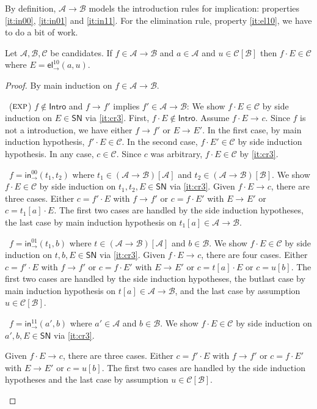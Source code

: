 \documentclass[a4paper,USenglish,cleveref, autoref, thm-restate]{lipics-v2019}
\newenvironment{caselist}{%
  \begin{list}{{\it Case}}{%
  }%
}{\end{list}%
}
\newcommand{\nextcase}{\item~}
\newcommand{\rulename}[1]{\ensuremath{\mbox{\textsc{#1}}}\xspace}
\newcommand{\rexp}{\rulename{exp}}
\newcommand{\tin}{\ensuremath{\mathsf{in}}}
\newcommand{\inn}[2]{\ensuremath{\tin_{#1}^{#2}}}
\newcommand{\tel}{\mathsf{el}}
\newcommand{\el}[2]{\ensuremath{\tel_{#1}^{#2}}}
\newcommand{\red}[1][]{\longrightarrow_{#1}}
\newcommand{\A}{\mathcal{A}}
\newcommand{\B}{\mathcal{B}}
\newcommand{\C}{\mathcal{C}}
\newcommand{\SN}{\mathsf{SN}}
\newcommand{\Intro}{\mathsf{Intro}}
\newcommand{\ind}[1]{}    %
\newcommand{\indp}[2]{#1} %
\begin{document}
By definition, $\A \to \B$ models the introduction rules for
implication:
properties \ref{it:in00}, \ref{it:in01} and \ref{it:in11}.
For the elimination rule, property \ref{it:el10}, we have to do a bit of work.
\begin{lemma}
  \label{lem:app}
  Let $\A,\B,\C$ be candidates.
  If $f \in \indp{\A \to \B}{\Gamma}$ and $a \in \A\ind\Gamma$ and
  $u \in \C[\B]\ind\Gamma$ then $f \cdot E \in \C$
  where $E = \el\to{10}(a,u)$.
\end{lemma}
\begin{proof}
  By main induction on $f \in \indp{\A \to \B}{\Gamma}$.
  \begin{caselist}

    \nextcase (\rexp) $f \not\in \Intro$ and $f \red f'$ implies
    $f' \in \indp{\A \to \B}{\Gamma}$:
    We show $f \cdot E \in \C$ by side induction on $E \in \SN$ via \ref{it:cr3}.
    First, $f \cdot E \not\in\Intro$.
    Assume $f \cdot E \red c$.  Since $f$ is not a introduction, we
    have either $f \red f'$ or $E \red E'$.  In the first case, by
    main induction hypothesis, $f' \cdot E \in \C$.
    In the second case, $f \cdot E' \in \C$ by side induction hypothesis.
    In any case, $c \in \C$.  Since $c$ was arbitrary, $f \cdot E \in
    \C$ by \ref{it:cr3}.

    \nextcase $f = \inn\to{00}(t_1,t_2)$ where
    $t_1 \in (\A \to \B)[\A]\ind\Gamma$ and
    $t_2 \in (\A \to \B)[\B]\ind\Gamma$.
    We show $f \cdot E \in \C$ by side induction on $t_1,t_2,E \in
    \SN$ via \ref{it:cr3}.
    Given $f \cdot E \red c$, there are three cases.  Either $c = f' \cdot
    E$ with $f \red f'$ or $c = f \cdot E'$ with $E \red E'$ or $c =
    t_1[a] \cdot E$.  The first two cases are handled by the side
    induction hypotheses, the last case by main induction hypothesis
    on $t_1[a] \in \indp{\A \to \B}{\Gamma}$.

    \nextcase $f = \inn\to{01}(t_1,b)$ where
    $t \in (\A \to \B)[\A]\ind\Gamma$ and
    $b \in \B\ind\Gamma$.
    We show $f \cdot E \in \C$ by side induction on $t,b,E \in
    \SN$ via \ref{it:cr3}.
    Given $f \cdot E \red c$, there are four cases.  Either $c = f' \cdot
    E$ with $f \red f'$ or $c = f \cdot E'$ with $E \red E'$ or $c =
    t[a] \cdot E$ or $c = u[b]$.  The first two cases are handled by the side
    induction hypotheses, the butlast case by main induction hypothesis
    on $t[a] \in \indp{\A \to \B}{\Gamma}$, and the last case by assumption
    $u \in \C[\B]\ind\Gamma$.

    \nextcase $f = \inn\to{11}(a',b)$ where
    $a' \in \A\ind\Gamma$ and
    $b \in \B\ind\Gamma$.
    We show $f \cdot E \in \C$ by side induction on $a',b,E \in
    \SN$ via \ref{it:cr3}.

    Given $f \cdot E \red c$, there are three cases.  Either
    $c = f' \cdot E$ with $f \red f'$ or $c = f \cdot E'$ with
    $E \red E'$ or $c = u[b]$.  The first two cases are handled by the
    side induction hypotheses and the last case by
    assumption $u \in \C[\B]\ind\Gamma$.
  \popQED
  \end{caselist}
\end{proof}
\end{document}
